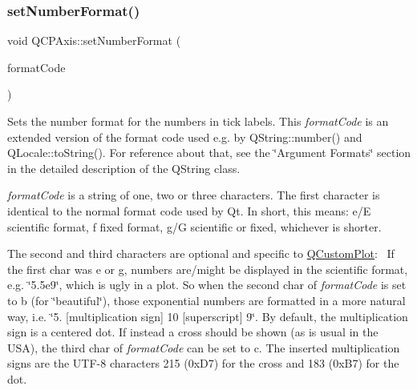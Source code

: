 \subsubsection{\texorpdfstring{set\+Number\+Format()}{setNumberFormat()}}
{\footnotesize\ttfamily void Q\+C\+P\+Axis\+::set\+Number\+Format (\begin{DoxyParamCaption}\item[{const Q\+String \&}]{format\+Code }\end{DoxyParamCaption})}

Sets the number format for the numbers in tick labels. This {\itshape format\+Code} is an extended version of the format code used e.\+g. by Q\+String\+::number() and Q\+Locale\+::to\+String(). For reference about that, see the \char`\"{}\+Argument Formats\char`\"{} section in the detailed description of the Q\+String class.

{\itshape format\+Code} is a string of one, two or three characters. The first character is identical to the normal format code used by Qt. In short, this means\+: \textquotesingle{}e\textquotesingle{}/\textquotesingle{}E\textquotesingle{} scientific format, \textquotesingle{}f\textquotesingle{} fixed format, \textquotesingle{}g\textquotesingle{}/\textquotesingle{}G\textquotesingle{} scientific or fixed, whichever is shorter.

The second and third characters are optional and specific to \hyperlink{class_q_custom_plot}{Q\+Custom\+Plot}\+:~\newline
If the first char was \textquotesingle{}e\textquotesingle{} or \textquotesingle{}g\textquotesingle{}, numbers are/might be displayed in the scientific format, e.\+g. \char`\"{}5.\+5e9\char`\"{}, which is ugly in a plot. So when the second char of {\itshape format\+Code} is set to \textquotesingle{}b\textquotesingle{} (for \char`\"{}beautiful\char`\"{}), those exponential numbers are formatted in a more natural way, i.\+e. \char`\"{}5.
\mbox{[}multiplication sign\mbox{]} 10 \mbox{[}superscript\mbox{]} 9\char`\"{}. By default, the multiplication sign is a centered dot. If instead a cross should be shown (as is usual in the U\+SA), the third char of {\itshape format\+Code} can be set to \textquotesingle{}c\textquotesingle{}. The inserted multiplication signs are the U\+T\+F-\/8 characters 215 (0x\+D7) for the cross and 183 (0x\+B7) for the dot.

